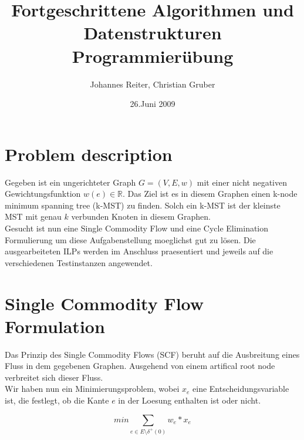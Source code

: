 \documentclass[a4paper,10pt]{article}
\title{Fortgeschrittene Algorithmen und Datenstrukturen \\ \bigskip \textbf{Programmier\"{u}bung}}
\author{Johannes Reiter, Christian Gruber}
\date{\vspace{1cm} 26.Juni 2009}
\begin{document}
\maketitle

\section{Problem description}
Gegeben ist ein ungerichteter Graph $G=(V,E,w)$ mit einer nicht negativen
Gewichtungsfunktion $w(e) \in \mathbb{R}$. Das Ziel ist es in diesem Graphen einen
k-node minimum spanning tree (k-MST) zu finden. Solch ein k-MST ist der
kleinste MST mit genau $k$ verbunden Knoten in diesem Graphen. \\
Gesucht ist nun eine Single Commodity Flow und eine Cycle Elimination
Formulierung um diese Aufgabenstellung moeglichst gut zu lösen. Die
ausgearbeiteten ILPs werden im Anschluss praesentiert und jeweils auf die
verschiedenen Testinstanzen angewendet.

\section{Single Commodity Flow Formulation}

Das Prinzip des Single Commodity Flows (SCF) beruht auf die Ausbreitung eines Fluss
in dem gegebenen Graphen. Ausgehend von einem artifical root node verbreitet sich
dieser Fluss. \\
Wir haben nun ein Minimierungsproblem, wobei $x_e$ eine Entscheidungsvariable ist,
die festlegt, ob die Kante $e$ in der Loesung enthalten ist oder nicht.

\begin{equation}
min \sum_{e \in E \setminus \delta^{+}(0)} w_e * x_e 
\end{equation}
\end{document}
